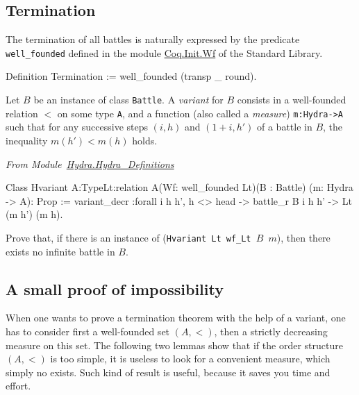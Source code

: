 \documentclass[a4paper]{book}
\begin{document}
\subsection{Termination}

The termination of all battles is naturally expressed by the predicate \texttt{well\_founded} defined in the module \href{https://coq.inria.fr/distrib/current/stdlib/Coq.Init.Wf.html}{Coq.Init.Wf} 
 of the Standard Library.


\begin{Coqsrc}
Definition Termination :=  well_founded (transp _ round).
\end{Coqsrc}


Let $B$ be an instance of class \texttt{Battle}. A \emph{variant} for $B$ consists
in a well-founded relation $<$  on some type \texttt{A}, and a function
(also called a \emph{measure}) \texttt{m:Hydra->A} such that for any successive steps $(i,h)$ and $(1+i,h')$  of a battle in $B$, the inequality $m(h')<m(h)$ holds.


\vspace{4pt}
\emph{From Module~\href{../src/html/hydras.Hydra.Hydra_Definitions.html\#Hvariant}{Hydra.Hydra\_Definitions}}

\label{sect:hvariant-def}

\begin{Coqsrc}
Class Hvariant {A:Type}{Lt:relation A}(Wf: well_founded Lt)(B : Battle)
  (m: Hydra -> A):   Prop :=
  {variant_decr :forall i h h',
      h <> head ->
      battle_r  B i  h h' -> Lt (m h') (m h)}.
\end{Coqsrc}  


\begin{exercise}
 Prove that, if there is an instance of (\texttt{Hvariant Lt wf\_Lt $B$ $m$}), then there exists no infinite battle in  $B$.
\end{exercise}




\subsection{A  small proof of impossibility}

\label{omega-case}

When one wants to prove a termination theorem with the help of a variant, 
one has to consider first a well-founded set $(A,<)$, then a strictly decreasing measure on this set.  The following two lemmas show that if  the order structure $(A,<)$ is too simple, it is useless to look for a convenient measure, which simply no exists. Such kind of result is useful, because it saves you time and effort.
\end{document}
